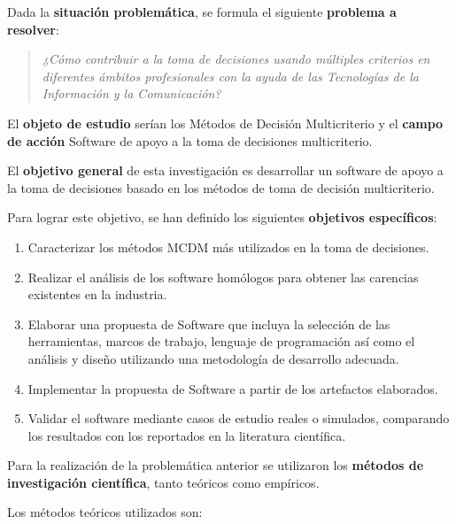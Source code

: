 Dada la \textbf{situación problemática}, se formula el siguiente \textbf{problema a resolver}:

\begin{quote}
	\textit{¿Cómo contribuir a la toma de decisiones usando múltiples criterios en diferentes ámbitos profesionales con la ayuda de las Tecnologías de la Información y la Comunicación?}
\end{quote}

El \textbf{objeto de estudio} serían los Métodos de Decisión Multicriterio y el \textbf{campo de acción} Software de apoyo a la toma de decisiones multicriterio.

El \textbf{objetivo general} de esta investigación es desarrollar un software de apoyo a la toma de decisiones basado en los métodos de toma de decisión multicriterio.

Para lograr este objetivo, se han definido los siguientes \textbf{objetivos específicos}:

\begin{enumerate}
	\item Caracterizar los métodos MCDM más utilizados en la toma de decisiones.
	\item Realizar el análisis de los software homólogos para obtener  las carencias existentes en la industria. 
	\item Elaborar una propuesta de Software que incluya la selección de las herramientas, marcos de trabajo, lenguaje de programación así como el análisis y diseño utilizando una metodología de desarrollo adecuada.
	\item Implementar la propuesta de Software a partir de los artefactos elaborados.
	\item Validar el software mediante casos de estudio reales o simulados, comparando los resultados con los reportados en la literatura científica.
\end{enumerate}

Para la realización de la problemática anterior se utilizaron los \textbf{métodos de investigación científica}, tanto teóricos como empíricos.

Los métodos teóricos utilizados son:

